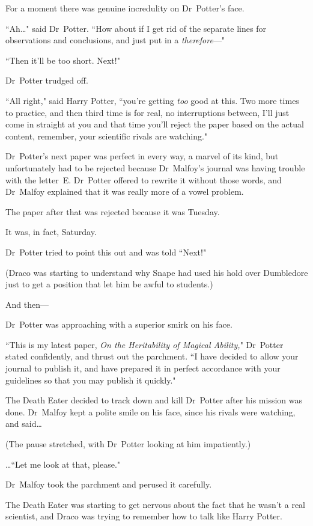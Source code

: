 For a moment there was genuine incredulity on Dr~Potter's face.

``Ah{\ldots}" said Dr~Potter. ``How about if I get rid of the separate lines for observations and conclusions, and just put in a \emph{therefore}—"

``Then it'll be too short. Next!"

Dr~Potter trudged off.

``All right," said Harry Potter, ``you're getting \emph{too} good at this. Two more times to practice, and then third time is for real, no interruptions between, I'll just come in straight at you and that time you'll reject the paper based on the actual content, remember, your scientific rivals are watching."

Dr~Potter's next paper was perfect in every way, a marvel of its kind, but unfortunately had to be rejected because Dr~Malfoy's journal was having trouble with the letter~E\@. Dr~Potter offered to rewrite it without those words, and Dr~Malfoy explained that it was really more of a vowel problem.

The paper after that was rejected because it was Tuesday.

It was, in fact, Saturday.

Dr~Potter tried to point this out and was told ``Next!"

(Draco was starting to understand why Snape had used his hold over Dumbledore just to get a position that let him be awful to students.)

And then—

Dr~Potter was approaching with a superior smirk on his face.

``This is my latest paper, \emph{On the Heritability of Magical Ability,}" Dr~Potter stated confidently, and thrust out the parchment. ``I have decided to allow your journal to publish it, and have prepared it in perfect accordance with your guidelines so that you may publish it quickly."

The Death Eater decided to track down and kill Dr~Potter after his mission was done. Dr~Malfoy kept a polite smile on his face, since his rivals were watching, and said{\ldots}

(The pause stretched, with Dr~Potter looking at him impatiently.)

{\ldots}``Let me look at that, please."

Dr~Malfoy took the parchment and perused it carefully.

The Death Eater was starting to get nervous about the fact that he wasn't a real scientist, and Draco was trying to remember how to talk like Harry Potter.

